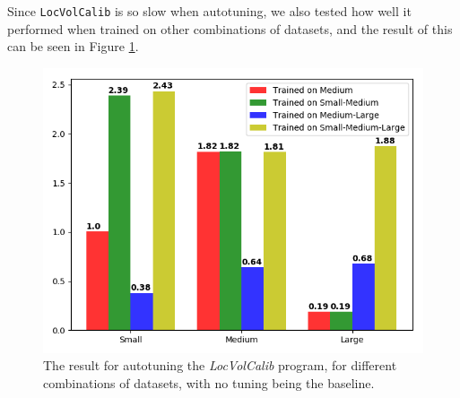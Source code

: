 Since \texttt{LocVolCalib} is so slow when autotuning, we also tested how well it performed when trained on other combinations of datasets, and the result of this can be seen in Figure \ref{LocVolCalibAll}.
\begin{figure}[H]
	\centering
	\includegraphics[width=.7\textwidth]{../benchmarks/LocVolCalibAll.png}
  \caption{The result for autotuning the \textit{LocVolCalib} program, for different combinations of datasets, with no tuning being the baseline.}
	\label{LocVolCalibAll}
\end{figure}
